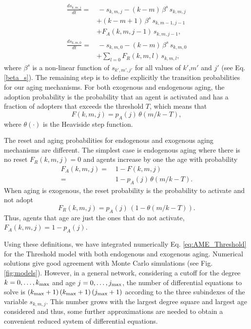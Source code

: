 \begin{align}
\label{eq:AME_Threshold}
   \frac{d s_{k,m,j}}{dt} = & \,  - s_{k,m,j} - (k-m)\, \beta^s \, s_{k,m,j} \nonumber\\ 
   & + (k-m+1) \, \beta^s \, s_{k,m-1,j-1}  \nonumber\\
   & + F_{A} (k,m,j-1)\, s_{k,m,j-1},  \\
     \frac{d s_{k,m,0}}{dt}  = & \,   - s_{k,m,0} - (k - m)\, \beta^s   \,s_{k,m,0} \nonumber \\
    & + \sum_{l = 0} F_{R} (k,m,l)\, s_{k,m,l}, \nonumber 
\end{align}
where $\beta^s$ is a non-linear function of $s_{k',m',j'}$ for all values of $k'$,$m'$ and $j'$  (see Eq. \eqref{beta_s}). The remaining step is to define explicitly the transition probabilities for our aging mechanisms. For both exogenous and endogenous aging, the adoption probability is the probability that an agent is activated and has a fraction of adopters that exceeds the threshold $T$, which means that 
\begin{equation}
F(k,m,j) = p_A(j) \, \theta(m/k - T),
\end{equation} 
where $\theta(\cdot)$ is the Heaviside step function. 

The reset and aging probabilities for endogenous and exogenous aging mechanisms are different. The simplest case is endogenous aging where there is no reset $F_{R} (k,m,j) = 0$ and agents increase by one the age with probability 
\begin{align}
F_{A} (k,m,j) =& \,  1 - F(k,m,j) \\ = & \, 1 - p_{A}(j)\, \theta \left(m/k - T\right). \nonumber
\end{align}
When aging is exogenous, the reset probability is the probability to activate and not adopt 
\begin{equation}
F_R (k,m,j) = p_A (j)\, \left(1 - \theta \left(m/k - T\right)\right). 
\end{equation}
Thus, agents that age are just the ones that do not activate, $F_A (k,m,j) = 1 - p_A(j)$.

Using these definitions, we have integrated numerically Eq. \eqref{eq:AME_Threshold} for the Threshold model with both endogenous and exogenous aging. Numerical solutions give  good agreement with Monte Carlo simulations (see Fig. \ref{fig:models}). However, in a general network, considering a cutoff for the degree $k = 0,\dots,k_{\rm{max}}$ and age $j = 0,\dots,j_{\rm{max}}$, the number of differential equations to solve is $(k_{\rm{max}} + 1)\, (k_{\rm{max}} + 1)\, (j_{\rm{max}} + 1)$ according to the three subindexes of the variable $s_{k,m,j}$. This number grows with the largest degree square and largest age considered and thus, some further approximations are needed to obtain a convenient reduced system of differential equations. 

